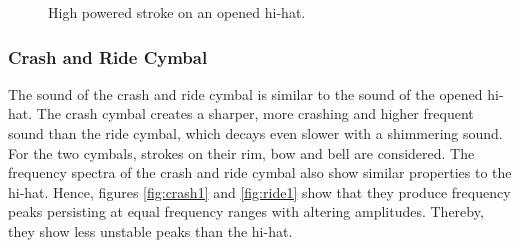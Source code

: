 \begin{figure}
	\centering
	\qquad	
	\caption{High powered stroke on an opened hi-hat.}
	\label{fig:hihat5}
\end{figure}

\newpage
\subsubsection{Crash and Ride Cymbal}

The sound of the crash and ride cymbal is similar to the sound of the opened hi-hat. The crash cymbal creates a sharper, more crashing and higher frequent sound than the ride cymbal, which decays even slower with a shimmering sound. For the two cymbals, strokes on their rim, bow and bell are considered. The frequency spectra of the crash and ride cymbal also show similar properties to the hi-hat. Hence, figures \ref{fig:crash1} and \ref{fig:ride1} show that they produce frequency peaks persisting at equal frequency ranges with altering amplitudes. Thereby, they show less unstable peaks than the hi-hat. 

